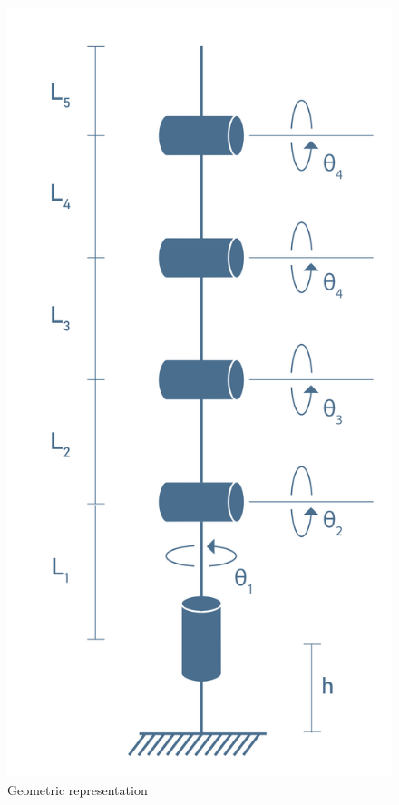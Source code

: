 \documentclass[11pt,a4paper, titlepage]{article}
\begin{document}
	\begin{figure}[H]
		\centering
		\includegraphics[width=0.3\linewidth]{../Diagrams/Model.png}
		\caption{Geometric representation}
		\label{fig:geometric}
	\end{figure}
	
\end{document}
